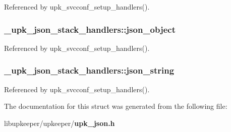 Referenced by upk\_\-svcconf\_\-setup\_\-handlers().

\subsubsection[{json\_\-object}]{ {\bf \_\-upk\_\-json\_\-stack\_\-handlers::json\_\-object}}\label{struct__upk__json__stack__handlers_a4333aaeebbe90aada241ed25e77a5f1d}


Referenced by upk\_\-svcconf\_\-setup\_\-handlers().

\subsubsection[{json\_\-string}]{ {\bf \_\-upk\_\-json\_\-stack\_\-handlers::json\_\-string}}\label{struct__upk__json__stack__handlers_a15a461cc1feaa19a8efa26791dad2552}


Referenced by upk\_\-svcconf\_\-setup\_\-handlers().



The documentation for this struct was generated from the following file:\begin{DoxyCompactItemize}
\item 
libupkeeper/upkeeper/{\bf upk\_\-json.h}\end{DoxyCompactItemize}
